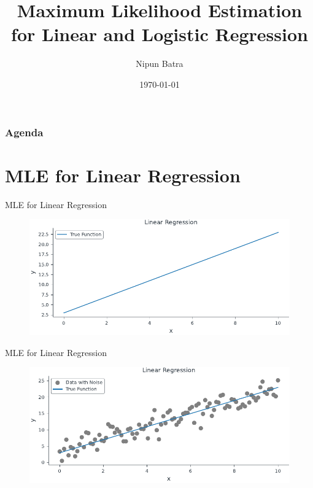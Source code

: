 \documentclass{beamer}
\begin{document}
\title{Maximum Likelihood Estimation for Linear and Logistic Regression}
\author{Nipun Batra}
\date{\today}
\maketitle
{}
\begin{frame}
    \frametitle{Agenda}
    \tableofcontents[hidesubsections]
    \end{frame}
    




\section{MLE for Linear Regression}
\begin{frame}{MLE for Linear Regression}
\begin{figure}
                \centerline{\includegraphics[scale=0.8]{../figures/mle/true_function_lin_reg.pdf}}
\end{figure}
\end{frame}
\begin{frame}{MLE for Linear Regression}
\begin{figure}
                \centerline{\includegraphics[scale=0.8]{../figures/mle/true_function_noise_lin_reg.pdf}}
\end{figure}
\end{frame}
\end{document}
